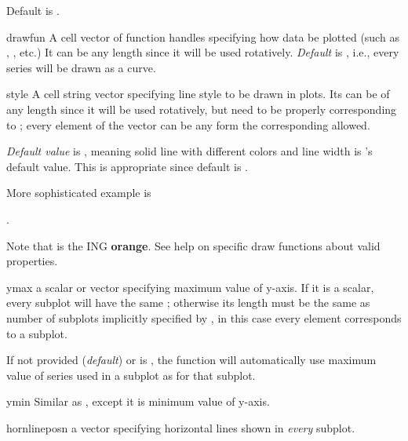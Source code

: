 \begin{argdesc}
\begin{argdesc}
                        Default is .
      \item[drawfun]    A cell vector of function handles specifying how data be plotted 
                        (such as , , etc.) 
                        It can be any length since it will be used rotatively.
                        \emph{Default} is , i.e., every series will be drawn as a curve.
      \item[style]      A cell string vector specifying line style to be drawn in plots. 
                        Its can be of any length since it will be used rotatively,
                        but need to be properly corresponding to ;
                        every element of the vector can be any form the corresponding  allowed.\par
                        \emph{Default value} is ,
                        meaning solid line with different colors and line width is \matlab's default value.
                        This is appropriate since default  is .\par
                        More sophisticated example is \par
                        . \par
                        Note that \mcode{[1 0.4 0]} is the ING \textcolor{ingorange}{\textbf{orange}}.
                        See \matlab{} help on specific draw functions about valid properties. 
      \item[ymax]       a scalar or vector specifying maximum value of y-axis. 
                        If it is a scalar, every subplot will have the same ; 
                        otherwise its length must be the same as number of subplots implicitly specified by ,
                        in this case every element corresponds to a subplot.\par
                        If not provided (\emph{default}) or is , 
                        the function will automatically use maximum value of series used in a subplot 
                        as  for that subplot.
      \item[ymin]       Similar as , except it is minimum value of y-axis. 
      \item[hornlineposn] a vector specifying horizontal lines shown in \emph{every} subplot. 

\end{argdesc}
\end{argdesc}
